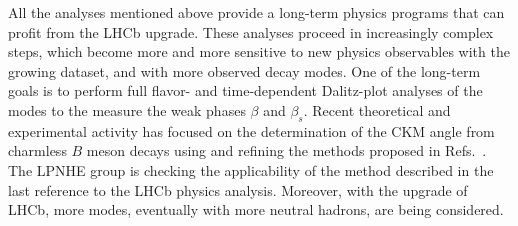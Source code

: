 All the analyses mentioned above provide a long-term physics programs that can profit from the LHCb upgrade. These analyses proceed in increasingly complex steps, which become more and more sensitive to new physics observables with the growing dataset, and with more observed decay modes. One of the long-term goals is to perform full flavor- and time-dependent Dalitz-plot analyses of the \BstoKshhp modes to the measure the weak phases $\beta$ and $\beta_s$. Recent theoretical and experimental activity has focused on the determination of the CKM angle \Pgamma from charmless $B$ meson decays using and refining the methods proposed in Refs.~\cite{Ciuchini:2006kv,Gronau:2006qn,Bhattacharya:2013cla}. The LPNHE group is checking the applicability of the method described in the last reference to the LHCb physics analysis. Moreover, with the upgrade of LHCb, more modes, eventually with more neutral hadrons, are being considered.
